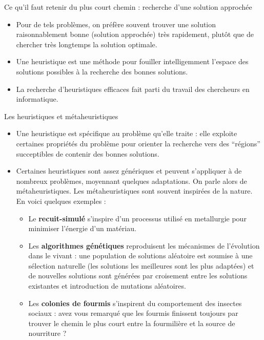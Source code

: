\begin{frame}{Ce qu'il faut retenir du plus court chemin : recherche d'une solution approchée}

  \begin{itemize}
    \item Pour de tels problèmes, on préfère souvent trouver une solution raisonnablement bonne (solution approchée) très rapidement, plutôt que de chercher très longtemps la solution optimale. 
    \item Une \alert{heuristique} est une méthode pour fouiller intelligemment l'espace des solutions possibles à la recherche des bonnes solutions.
    \item La recherche d'heuristiques efficaces fait parti du travail des chercheurs en informatique.
  \end{itemize}
  
  \begin{block}{Les heuristiques et métaheuristiques}

    \begin{itemize}
      \item Une heuristique est spécifique au problème qu'elle traite : elle exploite certaines propriétés du problème pour orienter la recherche vers des ``régions'' succeptibles de contenir des bonnes solutions.
      \item Certaines heuristiques sont assez génériques et peuvent s'appliquer à de nombreux problèmes, moyennant quelques adaptations. On parle alors de \alert{métaheuristiques}. Les métaheuristiques sont souvent inspirées de la nature. En voici quelques exemples : 
        \begin{itemize}
          \item Le \textbf{recuit-simulé} s'inspire d'un processus utilisé en metallurgie pour minimiser l'énergie d'un matériau.
          \item Les \textbf{algorithmes génétiques} reproduisent les mécanismes de l'évolution dans le vivant : une population de solutions aléatoire est soumise à une sélection naturelle (les solutions les meilleures sont les plus adaptées) et de nouvelles solutions sont générées par croisement entre les solutions existantes et introduction de mutations aléatoires.
          \item Les \textbf{colonies de fourmis} s'inspirent du comportement des insectes sociaux : avez vous remarqué que les fourmis finissent toujours par trouver le chemin le plus court entre la fourmilière et la source de nourriture ?
        \end{itemize}
    \end{itemize}
  \end{block}


\end{frame}
